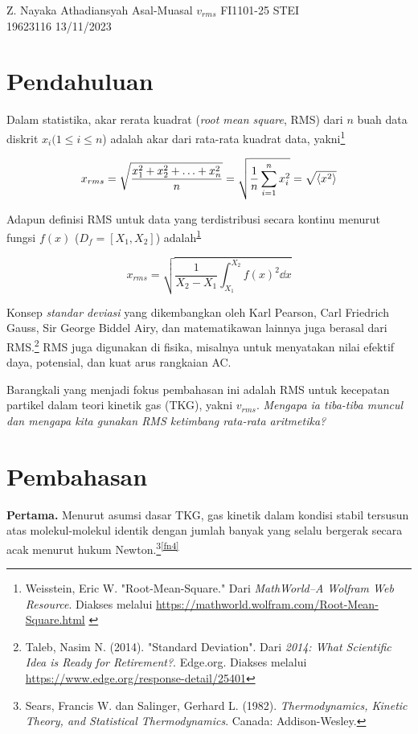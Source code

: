 \documentclass{article}
\begin{document}
	\noindent Z. Nayaka Athadiansyah \hfill {\Large Asal-Muasal $v_{rms}$} \hfill FI1101-25 STEI\\
	19623116 \hfill {} \hfill 13/11/2023
	
	\begin{multicols}{2}    
		\section{Pendahuluan}
		Dalam statistika, akar rerata kuadrat (\textit{root mean square}, RMS) dari $n$ buah data diskrit $x_i (1 \leq i \leq n$) adalah akar dari rata-rata kuadrat data, yakni\footnote{Weisstein, Eric W. "Root-Mean-Square." Dari \textit{MathWorld--A Wolfram Web Resource}. Diakses melalui \href{https://mathworld.wolfram.com/Root-Mean-Square.html}{https://mathworld.wolfram.com/Root-Mean-Square.html} \label{fn2}}
		
		\vspace{-1.25em}
		\begin{equation}
			x_{rms} = \sqrt{\frac{x_1^2 + x_2^2 + \ldots + x_n^2}{n}} = \sqrt{\frac{1}{n} \sum_{i=1}^{n} x_i^2} = \sqrt{\expval{x^2}}
		\end{equation}
		
		Adapun definisi RMS untuk data yang terdistribusi secara kontinu menurut fungsi $f(x)$ ($D_f = [X_1, X_2]$) adalah\textsuperscript{\ref{fn2}}
		
		\begin{equation}
			x_{rms} = \sqrt{\frac{1}{X_2 - X_1} \int_{X_1}^{X_2} f(x)^2 \dd{x}}
		\end{equation}
		\vspace{-.5em}
		
		Konsep \textit{standar deviasi} yang dikembangkan oleh Karl Pearson, Carl Friedrich Gauss, Sir George Biddel Airy, dan matematikawan lainnya juga berasal dari RMS.\footnote{Taleb, Nasim N. (2014). "Standard Deviation". Dari \textit{2014: What Scientific Idea is Ready for Retirement?}. Edge.org. Diakses melalui \href{https://www.edge.org/response-detail/25401}{https://www.edge.org/response-detail/25401}} RMS juga digunakan di fisika, misalnya untuk menyatakan nilai efektif daya, potensial, dan kuat arus rangkaian AC. 
		\par Barangkali yang menjadi fokus pembahasan ini adalah RMS untuk kecepatan partikel dalam teori kinetik gas (TKG), yakni $v_{rms}$. \textit{Mengapa ia tiba-tiba muncul dan mengapa kita gunakan RMS ketimbang rata-rata aritmetika?}
		
		\section{Pembahasan}
		\textbf{Pertama.} Menurut asumsi dasar TKG, gas kinetik dalam kondisi stabil tersusun atas molekul-molekul identik dengan jumlah banyak yang selalu bergerak secara acak menurut hukum Newton.\footnote{Sears, Francis W. dan Salinger, Gerhard L. (1982). \textit{Thermodynamics, Kinetic Theory, and Statistical Thermodynamics}. Canada: Addison-Wesley.\label{fn3}}\textsuperscript{\ref{fn4}}
		

\end{multicols}
\end{document}
